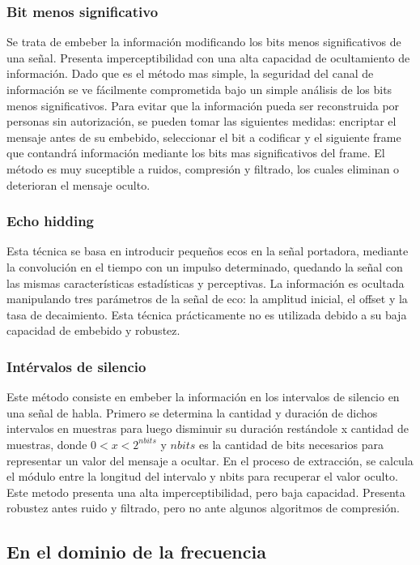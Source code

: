 \documentclass[conference,a4paper,10pt, oneside,final]{tfmpd}
\begin{document}
\subsubsection{Bit menos significativo} Se trata de embeber la información modificando los bits menos significativos de una señal. Presenta imperceptibilidad con una alta capacidad de ocultamiento de información. Dado que es el método mas simple, la seguridad del canal de información se ve fácilmente comprometida bajo un simple análisis de los bits menos significativos. Para evitar que la información pueda ser reconstruida por personas sin autorización, se pueden tomar las siguientes medidas: encriptar el mensaje antes de su embebido, seleccionar el bit a codificar y el siguiente frame que contandrá información mediante los bits mas significativos del frame.
El método es muy suceptible a ruidos, compresión y filtrado, los cuales eliminan o deterioran el mensaje oculto.

\subsubsection{Echo hidding}
Esta técnica se basa en introducir pequeños ecos en la señal portadora, mediante la convolución en el tiempo con
un impulso determinado, quedando la señal con las mismas características estadísticas y perceptivas. La información es ocultada manipulando tres parámetros de la señal de eco: la amplitud inicial, el offset y la tasa de decaimiento. Esta técnica prácticamente no es utilizada debido a su baja capacidad de embebido y robustez.

\subsubsection{Intérvalos de silencio}
Este método consiste en embeber la información en los intervalos de silencio en una señal de habla. Primero se determina la cantidad y duración de dichos intervalos en muestras para luego disminuir su duración restándole x cantidad de muestras, donde $0 < x < 2^{nbits}$ y $nbits$ es la cantidad de bits necesarios para representar un valor del mensaje a ocultar. En el proceso de extracción, se calcula el módulo entre la longitud del intervalo y nbits para recuperar el valor oculto. Este metodo presenta una alta imperceptibilidad, pero baja capacidad. Presenta robustez antes ruido y filtrado, pero no ante algunos algoritmos de compresión.


\subsection{En el dominio de la frecuencia}
\end{document}
